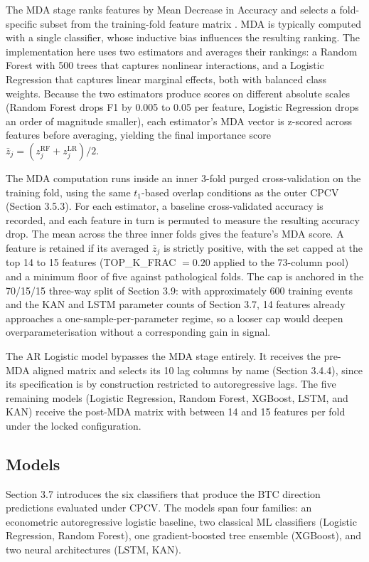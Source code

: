 \documentclass[12pt,a4paper,oneside]{article}
\begin{document}
The MDA stage ranks features by Mean Decrease in Accuracy and selects a fold-specific subset from the training-fold feature matrix \citep[Section 8.4]{lopez_de_prado_2018}. MDA is typically computed with a single classifier, whose inductive bias influences the resulting ranking. The implementation here uses two estimators and averages their rankings: a Random Forest with 500 trees that captures nonlinear interactions, and a Logistic Regression that captures linear marginal effects, both with balanced class weights. Because the two estimators produce scores on different absolute scales (Random Forest drops F1 by 0.005 to 0.05 per feature, Logistic Regression drops an order of magnitude smaller), each estimator's MDA vector is z-scored across features before averaging, yielding the final importance score $\bar{z}_j = (z^{\text{RF}}_j + z^{\text{LR}}_j) / 2$.

The MDA computation runs inside an inner 3-fold purged cross-validation on the training fold, using the same $t_1$-based overlap conditions as the outer CPCV (Section 3.5.3). For each estimator, a baseline cross-validated accuracy is recorded, and each feature in turn is permuted to measure the resulting accuracy drop. The mean across the three inner folds gives the feature's MDA score. A feature is retained if its averaged $\bar{z}_j$ is strictly positive, with the set capped at the top 14 to 15 features (TOP\_K\_FRAC $= 0.20$ applied to the 73-column pool) and a minimum floor of five against pathological folds. The cap is anchored in the 70/15/15 three-way split of Section 3.9: with approximately 600 training events and the KAN and LSTM parameter counts of Section 3.7, 14 features already approaches a one-sample-per-parameter regime, so a looser cap would deepen overparameterisation without a corresponding gain in signal.

The AR Logistic model bypasses the MDA stage entirely. It receives the pre-MDA aligned matrix and selects its 10 lag columns by name (Section 3.4.4), since its specification is by construction restricted to autoregressive lags. The five remaining models (Logistic Regression, Random Forest, XGBoost, LSTM, and KAN) receive the post-MDA matrix with between 14 and 15 features per fold under the locked configuration.


\subsection{Models}\label{subsec:models}

Section 3.7 introduces the six classifiers that produce the BTC direction predictions evaluated under CPCV. The models span four families: an econometric autoregressive logistic baseline, two classical ML classifiers (Logistic Regression, Random Forest), one gradient-boosted tree ensemble (XGBoost), and two neural architectures (LSTM, KAN).
\end{document}
